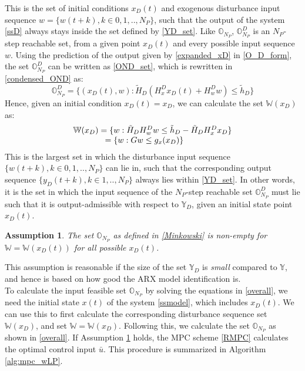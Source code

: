 \documentclass[letterpaper, 10 pt, conference]{ieeeconf}  %
\newtheorem{assumption}{Assumption}
\begin{document}
  This is the set of initial conditions $x_D(t)$ and exogenous disturbance input sequence $w=\{w(t+k),k \in 0, 1, .., N_P\}$, such that the output of the system \eqref{ssD} always stays inside the set defined by \eqref{YD_set}. Like $\mathbb{O}_{N_P}$, $\mathbb{O}_{N_P}^D$ is an $N_P$-step reachable set, from a given point $x_D(t)$ and every possible input sequence $w$.
  Using the prediction of the output given by \eqref{expanded_xD} in \eqref{O_D_form}, 
  the set $\mathbb{O}_{N_P}^D$ can be written as \eqref{OND_set}, which is rewritten in \eqref{condensed_OND} as:
  \begin{equation}
  \mathbb{O}_{N_P}^D=\{(x_D(t),w): \tilde{H}_D(H_x^Dx_D(t)+H_w^Dw) \leq \tilde{h}_D\}
  \label{condensed_OND}
  \end{equation}
  Hence, given an initial condition $x_D(t)=x_D$, we can calculate the set $\mathbb{W}(x_D)$ as:
  \begin{equation}
  \begin{matrix}
  \mathbb{W}(x_D) = \{w: \tilde{H}_DH_w^Dw \leq \tilde{h}_D-\tilde{H}_DH_x^Dx_D\} \\
  \hspace{-20pt}
   = \{w: Gw \leq g_x(x_D)\}
   \end{matrix}
   \label{w_xd_set}
  \end{equation}
  This is the largest set in which the disturbance input sequence $\{w(t+k),k \in 0,1,..,N_P\}$ can lie in, such that the corresponding output sequence $\{y_D(t+k),k \in 1,..,N_P\}$ always lies within \eqref{YD_set}. In other words, it is the set in which the input sequence of the $N_P$-step reachable set $\mathbb{O}_{N_P}^D$ must lie such that it is output-admissible with respect to $\mathbb{Y}_D$, given an initial state point $x_D(t)$.
   \begin{assumption}
   The set $\mathbb{O}_{N_P}$ as defined in \eqref{Minkowski} is non-empty for $\mathbb{W}=\mathbb{W}(x_D(t))$ for all possible $x_D(t)$.
   \label{assmp_nonEmpty}
   \end{assumption}
     \noindent 
  This assumption is reasonable if the size of the set $\mathbb{Y}_D$ is \textit{small} compared to $\mathbb{Y}$, and hence is based on how good the ARX model identification is.\\\indent
  To calculate the input feasible set $\mathbb{O}_{N_P}$ by solving the equations in \eqref{overall}, we need the initial state $x(t)$ of the system \eqref{ssmodel}, which includes $x_D(t)$. We can use this to first calculate the corresponding disturbance sequence set $\mathbb{W}(x_D)$, and set $\mathbb{W}=\mathbb{W}(x_D)$. Following this, we calculate the set $\mathbb{O}_{N_P}$ as shown in \eqref{overall}. If Assumption \ref{assmp_nonEmpty} holds, the MPC scheme \eqref{RMPC} calculates the optimal control input $\bar{u}$. This procedure is summarized in Algorithm \ref{alg:mpc_wLP}.
\end{document}
